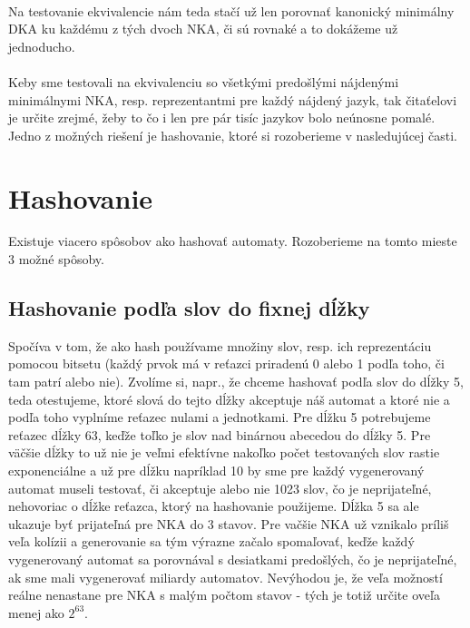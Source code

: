 \paragraph{}
Na testovanie ekvivalencie nám teda stačí už len porovnať kanonický minimálny DKA ku každému z tých dvoch NKA, či sú rovnaké a to dokážeme už jednoducho.

\paragraph{}
Keby sme testovali na ekvivalenciu so všetkými predošlými nájdenými minimálnymi NKA, resp. reprezentantmi pre každý nájdený jazyk, tak čitaťelovi je určite zrejmé, žeby to čo i len pre pár tisíc jazykov bolo neúnosne pomalé. Jedno z možných riešení je hashovanie, ktoré si rozoberieme v nasledujúcej časti.


\section{Hashovanie}
Existuje viacero spôsobov ako hashovať automaty. Rozoberieme na tomto mieste 3 možné spôsoby.

\subsection{Hashovanie podľa slov do fixnej dĺžky}
Spočíva v tom, že ako hash používame množiny slov, resp. ich reprezentáciu pomocou bitsetu (každý prvok má v reťazci priradenú 0 alebo 1 podľa toho, či tam patrí alebo nie). Zvolíme si, napr., že chceme hashovať podľa slov do dĺžky 5, teda otestujeme, ktoré slová do tejto dĺžky akceptuje náš automat a ktoré nie a podľa toho vyplníme reťazec nulami a jednotkami. Pre dĺžku 5 potrebujeme reťazec dĺžky 63, keďže toľko je slov nad binárnou abecedou do dĺžky 5. Pre väčšie dĺžky to už nie je veľmi efektívne nakoľko počet testovaných slov rastie exponenciálne a už pre dĺžku napríklad 10 by sme pre každý vygenerovaný automat museli testovať, či akceptuje alebo nie 1023 slov, čo je neprijateľné, nehovoriac o dĺžke reťazca, ktorý na hashovanie použijeme. Dĺžka 5 sa ale ukazuje byť prijateľná pre NKA do 3 stavov. Pre vačšie NKA už vznikalo príliš veľa kolízii a generovanie sa tým výrazne začalo spomaľovať, keďže každý vygenerovaný automat sa porovnával s desiatkami predošlých, čo je neprijateľné, ak sme mali vygenerovať miliardy automatov. Nevýhodou je, že veľa možností reálne nenastane pre NKA s malým počtom stavov - tých je totiž určite oveľa menej ako $2^{63}$.

